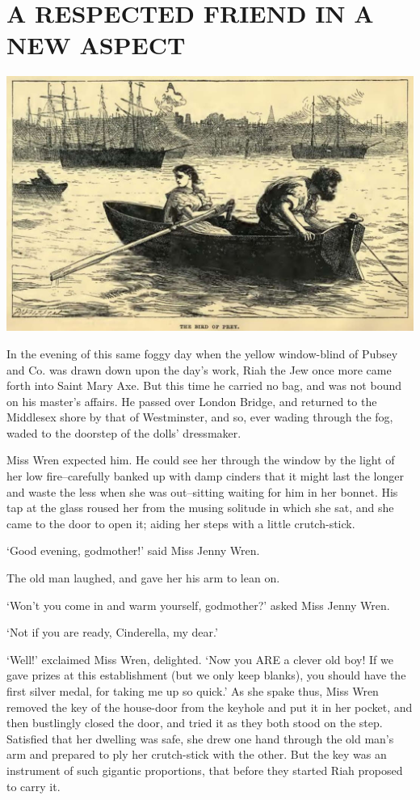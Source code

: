 
\chapter{A RESPECTED FRIEND IN A NEW ASPECT}

\includegraphics[scale=2.3]{01-01-01}

In the evening of this same foggy day when the yellow window-blind of
Pubsey and Co. was drawn down upon the day’s work, Riah the Jew once
more came forth into Saint Mary Axe. But this time he carried no bag,
and was not bound on his master’s affairs. He passed over London Bridge,
and returned to the Middlesex shore by that of Westminster, and so, ever
wading through the fog, waded to the doorstep of the dolls’ dressmaker.

Miss Wren expected him. He could see her through the window by the light
of her low fire--carefully banked up with damp cinders that it might
last the longer and waste the less when she was out--sitting waiting
for him in her bonnet. His tap at the glass roused her from the musing
solitude in which she sat, and she came to the door to open it; aiding
her steps with a little crutch-stick.

‘Good evening, godmother!’ said Miss Jenny Wren.

The old man laughed, and gave her his arm to lean on.

‘Won’t you come in and warm yourself, godmother?’ asked Miss Jenny Wren.

‘Not if you are ready, Cinderella, my dear.’

‘Well!’ exclaimed Miss Wren, delighted. ‘Now you ARE a clever old boy!
If we gave prizes at this establishment (but we only keep blanks), you
should have the first silver medal, for taking me up so quick.’ As she
spake thus, Miss Wren removed the key of the house-door from the keyhole
and put it in her pocket, and then bustlingly closed the door, and tried
it as they both stood on the step. Satisfied that her dwelling was safe,
she drew one hand through the old man’s arm and prepared to ply her
crutch-stick with the other. But the key was an instrument of such
gigantic proportions, that before they started Riah proposed to carry
it.

